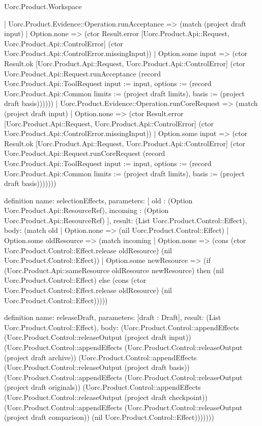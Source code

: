 \begin{lexlean}{Uorc.Product.Workspace}
\begin{semanticmodule}
{    | Uorc.Product.Evidence::Operation.runAcceptance => (match (project draft input)
      | Option.none => (ctor Result.error [Uorc.Product.Api::Request, Uorc.Product.Api::ControlError] (ctor Uorc.Product.Api::ControlError.missingInput))
      | Option.some input => (ctor Result.ok [Uorc.Product.Api::Request, Uorc.Product.Api::ControlError] (ctor Uorc.Product.Api::Request.runAcceptance (record Uorc.Product.Api::ToolRequest {input := input, options := (record Uorc.Product.Api::Common {limits := (project draft limits), basis := (project draft basis)})}))))
    | Uorc.Product.Evidence::Operation.runCoreRequest => (match (project draft input)
      | Option.none => (ctor Result.error [Uorc.Product.Api::Request, Uorc.Product.Api::ControlError] (ctor Uorc.Product.Api::ControlError.missingInput))
      | Option.some input => (ctor Result.ok [Uorc.Product.Api::Request, Uorc.Product.Api::ControlError] (ctor Uorc.Product.Api::Request.runCoreRequest (record Uorc.Product.Api::ToolRequest {input := input, options := (record Uorc.Product.Api::Common {limits := (project draft limits), basis := (project draft basis)})})))))
}

definition{
  name: selectionEffects,
  parameters: [
    old : (Option Uorc.Product.Api::ResourceRef),
    incoming : (Option Uorc.Product.Api::ResourceRef)
  ],
  result: (List Uorc.Product.Control::Effect),
  body: (match old
    | Option.none => (nil Uorc.Product.Control::Effect)
    | Option.some oldResource => (match incoming
      | Option.none => (cons (ctor Uorc.Product.Control::Effect.release oldResource) (nil Uorc.Product.Control::Effect))
      | Option.some newResource => (if (Uorc.Product.Api::sameResource oldResource newResource) then (nil Uorc.Product.Control::Effect) else (cons (ctor Uorc.Product.Control::Effect.release oldResource) (nil Uorc.Product.Control::Effect)))))
}

definition{
  name: releaseDraft,
  parameters: [draft : Draft],
  result: (List Uorc.Product.Control::Effect),
  body: (Uorc.Product.Control::appendEffects (Uorc.Product.Control::releaseOutput (project draft input)) (Uorc.Product.Control::appendEffects (Uorc.Product.Control::releaseOutput (project draft archive)) (Uorc.Product.Control::appendEffects (Uorc.Product.Control::releaseOutput (project draft basis)) (Uorc.Product.Control::appendEffects (Uorc.Product.Control::releaseOutput (project draft originals)) (Uorc.Product.Control::appendEffects (Uorc.Product.Control::releaseOutput (project draft checkpoint)) (Uorc.Product.Control::appendEffects (Uorc.Product.Control::releaseOutput (project draft comparison)) (nil Uorc.Product.Control::Effect)))))))
}


\end{semanticmodule}
\end{lexlean}
